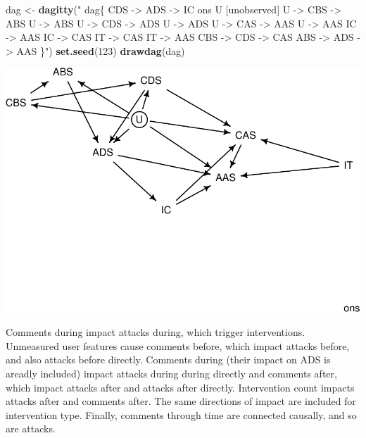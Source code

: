 \documentclass[10pt,dvipsnames,enabledeprecatedfontcommands]{scrartcl}
\newenvironment{Shaded}{\begin{snugshade}}{\end{snugshade}}
\newcommand{\KeywordTok}[1]{\textcolor[rgb]{0.13,0.29,0.53}{\textbf{#1}}}
\newcommand{\DecValTok}[1]{\textcolor[rgb]{0.00,0.00,0.81}{#1}}
\newcommand{\StringTok}[1]{\textcolor[rgb]{0.31,0.60,0.02}{#1}}
\newcommand{\NormalTok}[1]{#1}
\begin{document}
\begin{Shaded}
\begin{Highlighting}[]
\NormalTok{dag <-}\StringTok{ }\KeywordTok{dagitty}\NormalTok{(}\StringTok{"}
\StringTok{  dag\{}
\StringTok{  CDS -> ADS -> IC  ons}
\StringTok{               U [unobserved]   }
\StringTok{               U -> CBS -> ABS  }
\StringTok{               U -> ABS        }
\StringTok{               U -> CDS -> ADS  }
\StringTok{               U -> ADS         }
\StringTok{               U -> CAS -> AAS    }
\StringTok{               U -> AAS                        }
\StringTok{               IC -> AAS        }
\StringTok{               IC -> CAS        }
\StringTok{               IT -> CAS        }
\StringTok{               IT -> AAS}
\StringTok{               CBS -> CDS -> CAS}
\StringTok{               ABS -> ADS -> AAS}
\StringTok{               \}"}\NormalTok{)}
\KeywordTok{set.seed}\NormalTok{(}\DecValTok{123}\NormalTok{)}
\KeywordTok{drawdag}\NormalTok{(dag)}
\end{Highlighting}
\end{Shaded}

\begin{center}\includegraphics[width=1\linewidth]{bayesianReport_files/figure-latex/unnamed-chunk-10-1} \end{center}

\normalsize

Comments during impact attacks during, which trigger interventions.
Unmeasured user features cause comments before, which impact attacks
before, and also attacks before directly. Comments during (their impact
on ADS is areadly included) impact attacks during during directly and
comments after, which impact attacks after and attacks after directly.
Intervention count impacts attacks after and comments after. The same
directions of impact are included for intervention type. Finally,
comments through time are connected causally, and so are attacks.
\end{document}
